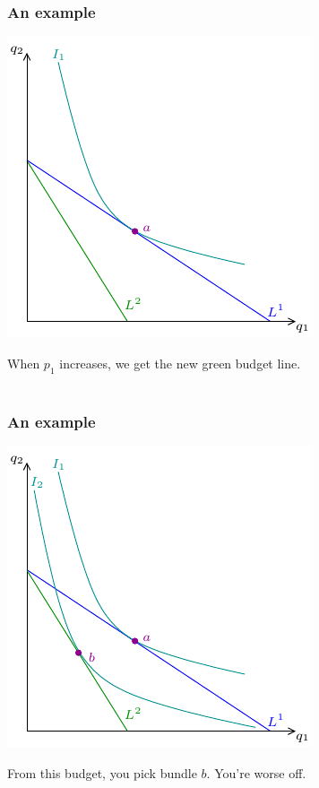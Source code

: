 \documentclass[xcolor=pdftex,dvipsnames]{beamer}
\begin{document}
\begin{frame}
\frametitle{An example}
\begin{center}
\includegraphics{pics/CVEV1}
\end{center}
When $p_1$ increases, we get the new green budget line.\\ \
\end{frame}




\begin{frame}
\frametitle{An example}
\begin{center}
\includegraphics{pics/CVEV2}
\end{center}
From this budget, you pick bundle $b$. You're worse off.\\ \
\end{frame}
\end{document}
